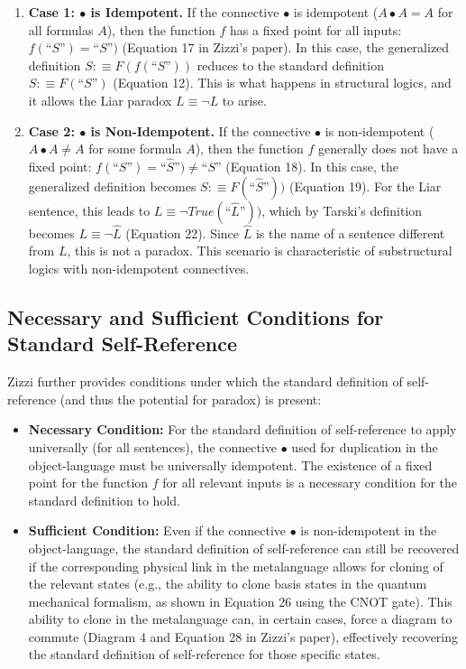 \documentclass{article}
\begin{document}
	\begin{enumerate}
		\item \textbf{Case 1: \(\bullet\) is Idempotent.} If the connective \(\bullet\) is idempotent (\(A \bullet A = A\) for all formulas \(A\)), then the function \(f\) has a fixed point for all inputs: \(f(\text{``}S\text{''}) = \text{``}S\text{''})\) (Equation 17 in Zizzi's paper). In this case, the generalized definition \(S :\equiv F(f(\text{``}S\text{''}))\) reduces to the standard definition \(S :\equiv F(\text{``}S\text{''})\) (Equation 12). This is what happens in structural logics, and it allows the Liar paradox \(L \equiv \neg L\) to arise.
		
		\item \textbf{Case 2: \(\bullet\) is Non-Idempotent.} If the connective \(\bullet\) is non-idempotent (\(A \bullet A \neq A\) for some formula \(A\)), then the function \(f\) generally does not have a fixed point: \(f(\text{``}S\text{''}) = \text{``}\widehat{S}\text{''}) \neq \text{``}S\text{''}\) (Equation 18). In this case, the generalized definition becomes \(S :\equiv F(\text{``}\widehat{S}\text{''}))\) (Equation 19). For the Liar sentence, this leads to \(L \equiv \neg True(\text{``}\widehat{L}\text{''}))\), which by Tarski's definition becomes \(L \equiv \neg \widehat{L}\) (Equation 22). Since \(\widehat{L}\) is the name of a sentence different from \(L\), this is not a paradox. This scenario is characteristic of substructural logics with non-idempotent connectives.
	\end{enumerate}
	
	\subsection{Necessary and Sufficient Conditions for Standard Self-Reference}
	
	Zizzi further provides conditions under which the standard definition of self-reference (and thus the potential for paradox) is present:
	
	\begin{itemize}
		\item \textbf{Necessary Condition:} For the standard definition of self-reference to apply universally (for all sentences), the connective \(\bullet\) used for duplication in the object-language must be universally idempotent. The existence of a fixed point for the function \(f\) for all relevant inputs is a necessary condition for the standard definition to hold.
		
		\item \textbf{Sufficient Condition:} Even if the connective \(\bullet\) is non-idempotent in the object-language, the standard definition of self-reference can still be recovered if the corresponding physical link in the metalanguage allows for cloning of the relevant states (e.g., the ability to clone basis states in the quantum mechanical formalism, as shown in Equation 26 using the CNOT gate). This ability to clone in the metalanguage can, in certain cases, force a diagram to commute (Diagram 4 and Equation 28 in Zizzi's paper), effectively recovering the standard definition of self-reference for those specific states.
	\end{itemize}
	
\end{document}
